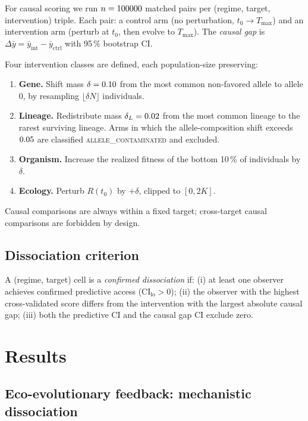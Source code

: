 \documentclass[11pt,a4paper]{article}
\newcommand{\Tfin}{T_{\max}}
\newcommand{\DeltaY}{\Delta\bar{y}}
\begin{document}
For causal scoring we run $n = 100000$ matched pairs per
(regime, target, intervention) triple.
Each pair: a control arm (no perturbation, $t_0 \to \Tfin$) and an
intervention arm (perturb at $t_0$, then evolve to $\Tfin$).
The \emph{causal gap} is $\DeltaY = \bar{y}_\mathrm{int} - \bar{y}_\mathrm{ctrl}$
with 95\,\% bootstrap CI.

Four intervention classes are defined, each population-size preserving:
\begin{enumerate}[label=\arabic*.,leftmargin=1.8em,itemsep=2pt]
  \item \textbf{Gene.} Shift mass $\delta = 0.10$ from the most common
        non-favored allele to allele 0, by resampling $\lfloor\delta N\rfloor$
        individuals.
  \item \textbf{Lineage.} Redistribute mass $\delta_L = 0.02$ from the
        most common lineage to the rarest surviving lineage.
        Arms in which the allele-composition shift exceeds $0.05$
        are classified \textsc{allele\_contaminated} and excluded.
  \item \textbf{Organism.} Increase the realized fitness of the bottom 10\,\%
        of individuals by $\delta$.
  \item \textbf{Ecology.} Perturb $R(t_0)$ by $+\delta$, clipped to $[0,2K]$.
\end{enumerate}
Causal comparisons are always within a fixed target; cross-target causal
comparisons are forbidden by design.

\subsection{Dissociation criterion}
\label{sec:diss}

A (regime, target) cell is a \emph{confirmed dissociation} if:
(i) at least one observer achieves confirmed predictive access
    ($\mathrm{CI}_\mathrm{lo} > 0$);
(ii) the observer with the highest cross-validated score differs
     from the intervention with the largest absolute causal gap;
(iii) both the predictive CI and the causal gap CI exclude zero.

\section{Results}
\label{sec:results}

\subsection{Eco-evolutionary feedback: mechanistic dissociation}
\label{sec:flagship}
\end{document}
